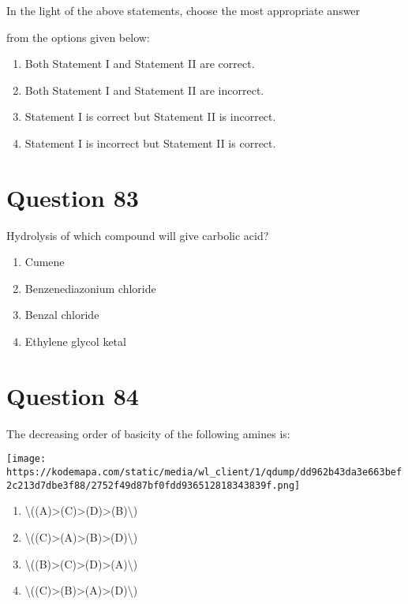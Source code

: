\documentclass{article}
\begin{document}
In the light of the above statements, choose the most appropriate answer

from the options given below:


\begin{enumerate}[label=(\alph*)]
\item Both Statement I and Statement II are correct.


\item Both Statement I and Statement II are incorrect.


\item Statement I is correct but Statement II is incorrect.


\item Statement I is incorrect but Statement II is correct.


\end{enumerate}
\newpage
\section*{Question 83}
Hydrolysis of which compound will give carbolic acid?


\begin{enumerate}[label=(\alph*)]
\item Cumene


\item Benzenediazonium chloride


\item Benzal chloride


\item Ethylene glycol ketal


\end{enumerate}
\newpage
\section*{Question 84}
The decreasing order of basicity of the following amines is:



\texttt{[image: https://kodemapa.com/static/media/wl\_client/1/qdump/dd962b43da3e663bef2c213d7dbe3f88/2752f49d87bf0fdd936512818343839f.png]}\\


\begin{enumerate}[label=(\alph*)]
\item \textbackslash((A)\textgreater(C)\textgreater(D)\textgreater(B)\textbackslash)


\item \textbackslash((C)\textgreater(A)\textgreater(B)\textgreater(D)\textbackslash)


\item \textbackslash((B)\textgreater(C)\textgreater(D)\textgreater(A)\textbackslash)


\item \textbackslash((C)\textgreater(B)\textgreater(A)\textgreater(D)\textbackslash)


\end{enumerate}
\newpage
\end{document}
